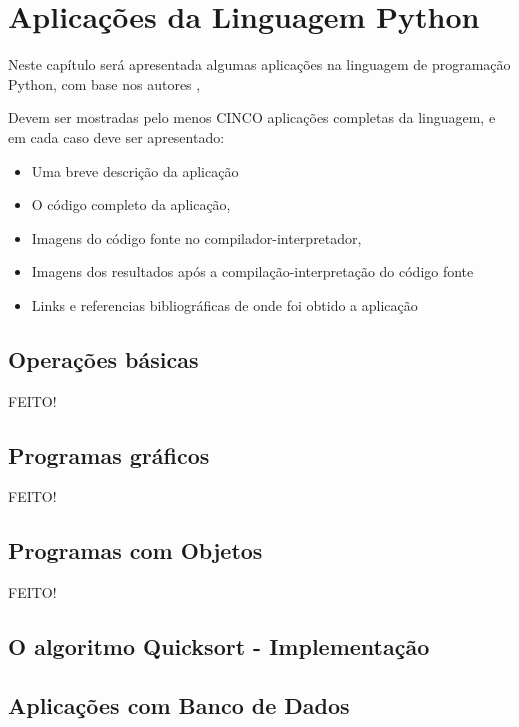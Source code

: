 


\chapter{ Aplica\c{c}\~{o}es da Linguagem Python}

Neste capítulo será apresentada algumas aplicações na linguagem de programação Python, com base nos autores \cite{Perkovic2016}, 


Devem ser mostradas pelo menos CINCO aplica\c{c}\~{o}es completas da linguagem, e em cada caso deve ser apresentado:
\begin{itemize}
  \item Uma breve descri\c{c}\~{a}o da aplica\c{c}\~{a}o
  \item O c\'{o}digo completo da aplica\c{c}\~{a}o,
  \item Imagens do c\'{o}digo fonte no compilador-interpretador,
  \item Imagens dos resultados ap\'{o}s a compila\c{c}\~{a}o-interpreta\c{c}\~{a}o do c\'{o}digo fonte
  \item Links e referencias bibliogr\'{a}ficas de onde foi obtido a aplica\c{c}\~{a}o
\end{itemize}




    \section{Opera\c{c}\~{o}es b\'{a}sicas}
	FEITO!

    \section{Programas gr\'{a}ficos}
	FEITO!

    \section{Programas com Objetos}
	FEITO!
		
    \section{O algoritmo Quicksort - Implementação}

	
    \section{Aplica\c{c}\~{o}es com Banco de Dados}


